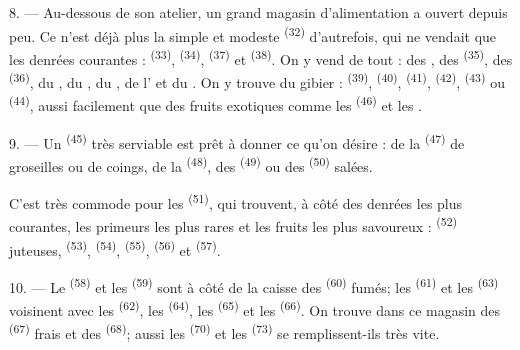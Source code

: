 \VUsaut{4.0mm}
\VUsaut{3.0mm}

8. --- Au-dessous de son atelier, un grand magasin d'alimentation a ouvert
depuis peu. Ce n'est déjà plus la simple et modeste 
\textsuperscript{(32)} d'autrefois, qui ne vendait que les denrées courantes :
 \textsuperscript{(33)},  \textsuperscript{(34)},
 \textsuperscript{(37)} et 
\textsuperscript{(38)}. On y vend de tout : des , des
 \textsuperscript{(35)}, des 
\textsuperscript{(36)}, du , du , du
, de l' et du . On y trouve du
gibier :  \textsuperscript{(39)}, 
\textsuperscript{(40)},  \textsuperscript{(41)},
 \textsuperscript{(42)}, 
\textsuperscript{(43)} ou  \textsuperscript{(44)}, aussi
facilement que des fruits exotiques comme les 
\textsuperscript{(46)} et les .

9. --- Un  \textsuperscript{(45)} très serviable est prêt à
donner ce qu'on désire : de la  \textsuperscript{(47)} de
groseilles ou de coings, de la  \textsuperscript{(48)}, des
 \textsuperscript{(49)} ou des 
\textsuperscript{(50)} salées.

C'est très commode pour les  \textsuperscript{(51)}, qui
trouvent, à côté des denrées les plus courantes, les primeurs les plus rares et
les fruits les plus savoureux :  \textsuperscript{(52)}
juteuses,  \textsuperscript{(53)}, 
\textsuperscript{(54)},  \textsuperscript{(55)},
 \textsuperscript{(56)} et 
\textsuperscript{(57)}.

\VUsaut{4.0mm}
\VUsaut{3.0mm}

10. --- Le  \textsuperscript{(58)} et les 
\textsuperscript{(59)} sont à côté de la caisse des 
\textsuperscript{(60)} fumés; les  \textsuperscript{(61)}
et les  \textsuperscript{(63)} voisinent avec les
 \textsuperscript{(62)}, les 
\textsuperscript{(64)}, les  \textsuperscript{(65)} et les
 \textsuperscript{(66)}. On trouve dans ce magasin des
 \textsuperscript{(67)} frais et des 
\textsuperscript{(68)}; aussi les  \textsuperscript{(70)} et les
 \textsuperscript{(73)} se remplissent-ils très vite.


